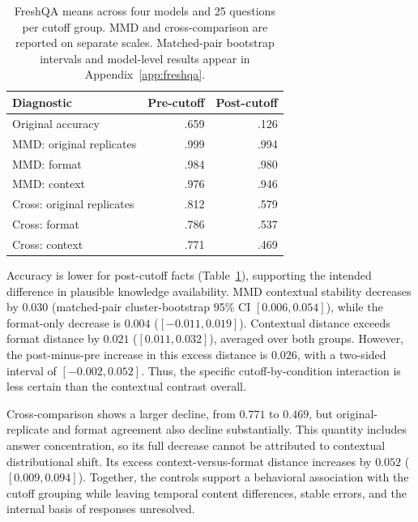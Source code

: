 \documentclass[11pt]{article}
\theoremstyle{plain}
\theoremstyle{definition}
\theoremstyle{remark}
\newif\ifrevisionmarkup
\DeclareRobustCommand{\revisioncolor}{\ifrevisionmarkup\color{red}\fi}
\newenvironment{revision}{\par\begingroup\revisioncolor}{\par\endgroup}
\begin{document}
\begin{table}[t]
\centering\small\revisioncolor
\setlength{\tabcolsep}{3pt}
\begin{tabular}{lrr}
\toprule
Diagnostic & Pre-cutoff & Post-cutoff\\
\midrule
Original accuracy & .659 & .126\\
\midrule
MMD: original replicates & .999 & .994\\
MMD: format & .984 & .980\\
MMD: context & .976 & .946\\
\midrule
Cross: original replicates & .812 & .579\\
Cross: format & .786 & .537\\
Cross: context & .771 & .469\\
\bottomrule
\end{tabular}
\caption{FreshQA means across four models and 25 questions per cutoff group. MMD and cross-comparison are reported on separate scales. Matched-pair bootstrap intervals and model-level results appear in Appendix~\ref{app:freshqa}.}
\label{tab:freshqa}
\end{table}
\begin{revision}
Accuracy is lower for post-cutoff facts (Table~\ref{tab:freshqa}), supporting the intended difference in plausible knowledge availability. MMD contextual stability decreases by $0.030$ (matched-pair cluster-bootstrap 95\% CI $[0.006,0.054]$), while the format-only decrease is $0.004$ ($[-0.011,0.019]$). Contextual distance exceeds format distance by $0.021$ ($[0.011,0.032]$), averaged over both groups. However, the post-minus-pre increase in this excess distance is $0.026$, with a two-sided interval of $[-0.002,0.052]$. Thus, the specific cutoff-by-condition interaction is less certain than the contextual contrast overall.

Cross-comparison shows a larger decline, from $0.771$ to $0.469$, but original-replicate and format agreement also decline substantially. This quantity includes answer concentration, so its full decrease cannot be attributed to contextual distributional shift. Its excess context-versus-format distance increases by $0.052$ ($[0.009,0.094]$). Together, the controls support a behavioral association with the cutoff grouping while leaving temporal content differences, stable errors, and the internal basis of responses unresolved.
\end{revision}
\end{document}
